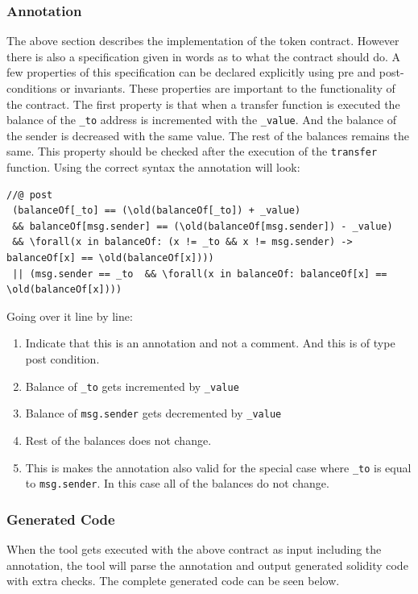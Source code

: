 \documentclass[a4paper]{article}
\begin{document}
\subsubsection{Annotation}
The above section describes the implementation of the token contract. However there is also a specification given in words as to what the contract should do. A few properties of this specification can be declared explicitly using pre and post-conditions or invariants. These properties are important to the functionality of the contract. 
The first property is that when a transfer function is executed the balance of the \texttt{\_to} address is incremented with the \texttt{\_value}. And the balance of the sender is decreased with the same value. The rest of the balances remains the same. This property should be checked after the execution of the \texttt{transfer} function. Using the correct syntax the annotation will look:
\begin{lstlisting}[basicstyle=\ttfamily, breaklines=true ]
//@ post 
 (balanceOf[_to] == (\old(balanceOf[_to]) + _value) 
 && balanceOf[msg.sender] == (\old(balanceOf[msg.sender]) - _value) 
 && \forall(x in balanceOf: (x != _to && x != msg.sender) -> balanceOf[x] == \old(balanceOf[x]))) 
 || (msg.sender == _to  && \forall(x in balanceOf: balanceOf[x] == \old(balanceOf[x])))
\end{lstlisting}
Going over it line by line:
\begin{enumerate}
  \item Indicate that this is an annotation and not a comment. And this is of type post condition.
  \item Balance of \texttt{\_to} gets incremented by \texttt{\_value}
  \item Balance of \texttt{msg.sender} gets decremented by \texttt{\_value}
  \item Rest of the balances does not change.
  \item This is makes the annotation also valid for the special case where \texttt{\_to} is equal to \texttt{msg.sender}. In this case all of the balances do not change.
\end{enumerate}

\subsubsection{Generated Code}
When the tool gets executed with the above contract as input including the annotation, the tool will parse the annotation and output generated solidity code with extra checks. 
The complete generated code can be seen below.

\end{document}

